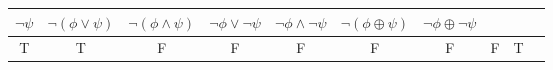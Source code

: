 \documentclass[oneside]{report}
\theoremstyle{definition}
\theoremstyle{definition}
\theoremstyle{definition}
\theoremstyle{remark}
\begin{document}
\begin{longtable}[]{@{}cccccccccc@{}}
\begin{minipage}[b]{0.04\columnwidth}
\(\lnot \psi\)\strut
\end{minipage} & \begin{minipage}[b]{0.08\columnwidth}\centering\strut
\(\lnot (\phi \lor \psi)\)\strut
\end{minipage} & \begin{minipage}[b]{0.08\columnwidth}\centering\strut
\(\lnot (\phi \land \psi)\)\strut
\end{minipage} & \begin{minipage}[b]{0.08\columnwidth}\centering\strut
\(\lnot \phi \lor \lnot \psi\)\strut
\end{minipage} & \begin{minipage}[b]{0.08\columnwidth}\centering\strut
\(\lnot \phi \land \lnot \psi\)\strut
\end{minipage} & \begin{minipage}[b]{0.09\columnwidth}\centering\strut
\(\lnot (\phi \oplus \psi)\)\strut
\end{minipage} & \begin{minipage}[b]{0.08\columnwidth}\centering\strut
\(\lnot \phi \oplus \lnot \psi\)\strut
\end{minipage}\tabularnewline
\midrule
\endhead
\begin{minipage}[t]{0.04\columnwidth}\centering\strut
T\strut
\end{minipage} & \begin{minipage}[t]{0.04\columnwidth}\centering\strut
T\strut
\end{minipage} & \begin{minipage}[t]{0.04\columnwidth}\centering\strut
F\strut
\end{minipage} & \begin{minipage}[t]{0.04\columnwidth}\centering\strut
F\strut
\end{minipage} & \begin{minipage}[t]{0.08\columnwidth}\centering\strut
F\strut
\end{minipage} & \begin{minipage}[t]{0.08\columnwidth}\centering\strut
F\strut
\end{minipage} & \begin{minipage}[t]{0.08\columnwidth}\centering\strut
F\strut
\end{minipage} & \begin{minipage}[t]{0.08\columnwidth}\centering\strut
F\strut
\end{minipage} & \begin{minipage}[t]{0.09\columnwidth}\centering\strut
T\strut

\end{minipage}
\end{longtable}
\end{document}
